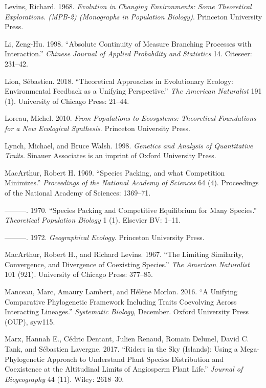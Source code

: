 \documentclass[]{article}
\begin{document}
\leavevmode\hypertarget{ref-9780691080628}{}%
Levins, Richard. 1968. \emph{Evolution in Changing Environments: Some
Theoretical Explorations. (MPB-2) (Monographs in Population Biology)}.
Princeton University Press.

\leavevmode\hypertarget{ref-zeng1998absolute}{}%
Li, Zeng-Hu. 1998. ``Absolute Continuity of Measure Branching Processes
with Interaction.'' \emph{Chinese Journal of Applied Probability and
Statistics} 14. Citeseer: 231--42.

\leavevmode\hypertarget{ref-Lion2018}{}%
Lion, Sébastien. 2018. ``Theoretical Approaches in Evolutionary Ecology:
Environmental Feedback as a Unifying Perspective.'' \emph{The American
Naturalist} 191 (1). University of Chicago Press: 21--44.

\leavevmode\hypertarget{ref-michelloreau2010}{}%
Loreau, Michel. 2010. \emph{From Populations to Ecosystems: Theoretical
Foundations for a New Ecological Synthesis}. Princeton University Press.

\leavevmode\hypertarget{ref-michaellynch1998}{}%
Lynch, Michael, and Bruce Walsh. 1998. \emph{Genetics and Analysis of
Quantitative Traits}. Sinauer Associates is an imprint of Oxford
University Press.

\leavevmode\hypertarget{ref-Arthur1969}{}%
MacArthur, Robert H. 1969. ``Species Packing, and what Competition
Minimizes.'' \emph{Proceedings of the National Academy of Sciences} 64
(4). Proceedings of the National Academy of Sciences: 1369--71.

\leavevmode\hypertarget{ref-MacArthur1970}{}%
---------. 1970. ``Species Packing and Competitive Equilibrium for Many
Species.'' \emph{Theoretical Population Biology} 1 (1). Elsevier BV:
1--11.

\leavevmode\hypertarget{ref-9780691023823}{}%
---------. 1972. \emph{Geographical Ecology}. Princeton University
Press.

\leavevmode\hypertarget{ref-Macarthur1967}{}%
MacArthur, Robert H., and Richard Levins. 1967. ``The Limiting
Similarity, Convergence, and Divergence of Coexisting Species.''
\emph{The American Naturalist} 101 (921). University of Chicago Press:
377--85.

\leavevmode\hypertarget{ref-Manceau2016}{}%
Manceau, Marc, Amaury Lambert, and Hélène Morlon. 2016. ``A Unifying
Comparative Phylogenetic Framework Including Traits Coevolving Across
Interacting Lineages.'' \emph{Systematic Biology}, December. Oxford
University Press (OUP), syw115.

\leavevmode\hypertarget{ref-Marx2017}{}%
Marx, Hannah E., Cédric Dentant, Julien Renaud, Romain Delunel, David C.
Tank, and Sébastien Lavergne. 2017. ``Riders in the Sky (Islands): Using
a Mega-Phylogenetic Approach to Understand Plant Species Distribution
and Coexistence at the Altitudinal Limits of Angiosperm Plant Life.''
\emph{Journal of Biogeography} 44 (11). Wiley: 2618--30.
\end{document}
